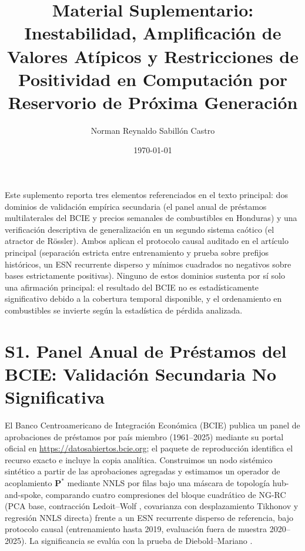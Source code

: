 \documentclass[aip,cha,reprint,amsmath,amssymb]{revtex4-2}
\begin{document}
\title{Material Suplementario: Inestabilidad, Amplificaci\'on de Valores At\'ipicos y Restricciones de Positividad en Computaci\'on por Reservorio de Pr\'oxima Generaci\'on}

\author{Norman Reynaldo Sabill{\'o}n Castro}

\date{\today}

\maketitle

\noindent Este suplemento reporta tres elementos referenciados en el texto principal: dos dominios de validación empírica secundaria (el panel anual de préstamos multilaterales del BCIE y precios semanales de combustibles en Honduras) y una verificación descriptiva de generalización en un segundo sistema caótico (el atractor de R\"ossler). Ambos aplican el protocolo causal auditado en el artículo principal (separación estricta entre entrenamiento y prueba sobre prefijos históricos, un ESN recurrente disperso y mínimos cuadrados no negativos sobre bases estrictamente positivas). Ninguno de estos dominios sustenta por sí solo una afirmación principal: el resultado del BCIE no es estadísticamente significativo debido a la cobertura temporal disponible, y el ordenamiento en combustibles se invierte según la estadística de pérdida analizada.

\section{S1. Panel Anual de Préstamos del BCIE: Validación Secundaria No Significativa}
\label{sec:bcie}

El Banco Centroamericano de Integración Económica (BCIE) publica un panel de aprobaciones de préstamos por país miembro (1961--2025) mediante su portal oficial en \url{https://datosabiertos.bcie.org}; el paquete de reproducción identifica el recurso exacto e incluye la copia analítica. Construimos un nodo sistémico sintético a partir de las aprobaciones agregadas y estimamos un operador de acoplamiento $\mathbf{P}^*$ mediante NNLS por filas bajo una máscara de topología hub-and-spoke, comparando cuatro compresiones del bloque cuadrático de NG-RC (PCA base, contracción Ledoit--Wolf \cite{ledoitwolf2004wellconditioned}, covarianza con desplazamiento Tikhonov y regresión NNLS directa) frente a un ESN recurrente disperso de referencia, bajo protocolo causal (entrenamiento hasta 2019, evaluación fuera de muestra 2020--2025). La significancia se evalúa con la prueba de Diebold--Mariano \cite{dieboldmariano1995comparing}.
\end{document}
